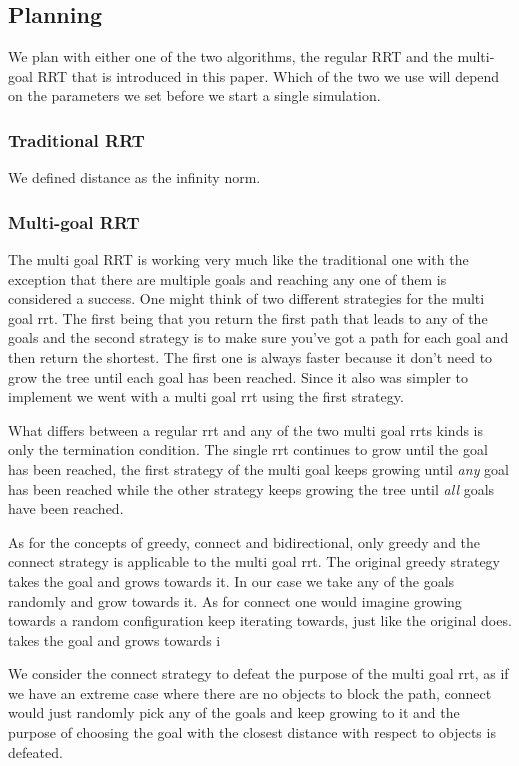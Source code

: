 \documentclass[letterpaper, 10 pt, conference]{ieeeconf}  %
\begin{document}
\subsection{Planning}

We plan with either one of the two algorithms, the regular RRT
and the
multi-goal RRT that is introduced in this paper. Which of the two we use
will depend on the parameters we set before we start a single
simulation.

\subsubsection{Traditional RRT}

We defined distance as the infinity norm.

\subsubsection{Multi-goal RRT}

The multi goal RRT is working very much like the traditional one with
the exception that there are multiple goals and reaching any one of them
is considered a success. One might think of two different strategies for
the multi goal rrt. The first being that you return the first path that
leads to any of the goals and the second strategy is to make sure you've
got a path for each goal and then return the shortest. The first one is
always faster because it don't need to grow the tree until each goal has
been reached. Since it also was simpler to implement we went with a
multi goal rrt using the first strategy.

What differs between a regular rrt and any of the two multi goal rrts
kinds is only the termination condition. The single rrt continues to
grow until the goal has been reached, the first strategy of the multi
goal keeps growing until \emph{any} goal has been reached while the
other strategy keeps growing the tree until \emph{all} goals have been
reached.

As for the concepts of greedy, connect and bidirectional, only greedy
and the connect strategy is applicable to the multi goal rrt. The
original greedy strategy takes the goal and grows towards it. In our
case we take any of the goals randomly and grow towards
it\cite{rrt-greedy}. As for connect one would imagine growing towards a
random configuration keep iterating towards, just like the original
does\cite{kuffner2000rrt}.  takes the goal and grows towards i

We consider the connect strategy to defeat the purpose of the
multi goal rrt, as if we have an extreme case where there are no objects to
block the path, connect would just randomly pick any of the goals and keep
growing to it and the purpose of choosing the goal with the closest distance
with respect to objects is defeated.
\end{document}
